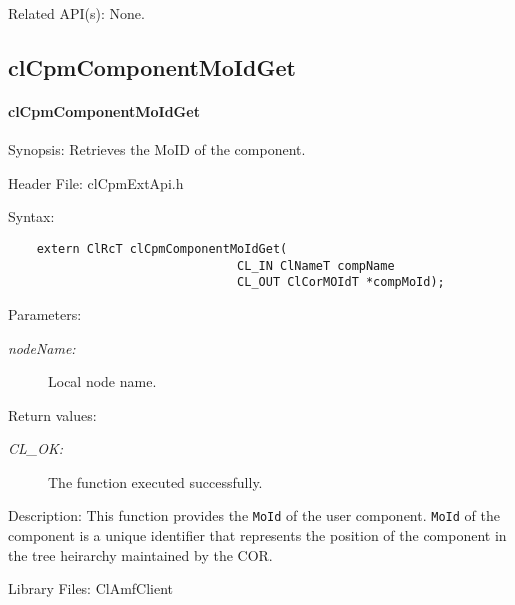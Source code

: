 {\begin{Desc}
\item[Related API(s):]None. \end{Desc}
\newpage







\subsection{clCpmComponentMoIdGet}
\hypertarget{pagecpm201}{}\paragraph{cl\-Cpm\-Component\-Mo\-Id\-Get}\label{pagecpm201}
\begin{Desc}
\item[Synopsis:]Retrieves the MoID of the component.\end{Desc}
\begin{Desc}
\item[Header File:]clCpmExtApi.h\end{Desc}
\begin{Desc}
\item[Syntax:]

\footnotesize\begin{verbatim}    extern ClRcT clCpmComponentMoIdGet(
                      			CL_IN ClNameT compName
                      			CL_OUT ClCorMOIdT *compMoId);
\end{verbatim}
\normalsize
\end{Desc}
\begin{Desc}
\item[Parameters:]
\begin{description}
\item[{\em node\-Name:}]Local node name.\end{description}
\end{Desc}
\begin{Desc}
\item[Return values:]
\begin{description}
\item[{\em CL\_\-OK:}]The function executed successfully.\end{description}
\end{Desc}
\begin{Desc}
\item[Description:]This function provides the {\tt{Mo\-Id}} of the user component. {\tt{Mo\-Id}} of the component is a unique identifier that represents
the position of the component in the tree heirarchy maintained by the COR.\end{Desc}
\begin{Desc}
\item[Library Files:]Cl\-Amf\-Client\end{Desc}

}

